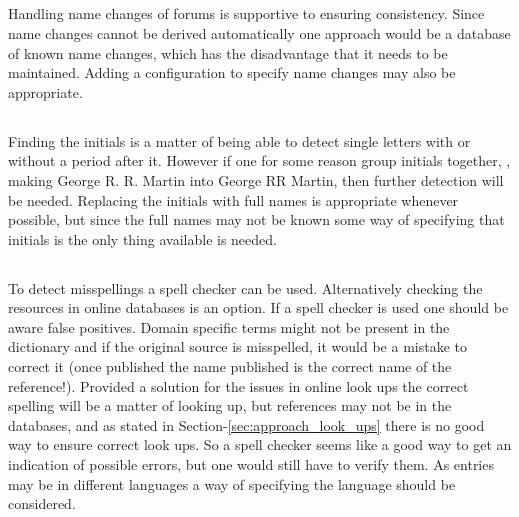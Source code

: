 \subsection{}

Handling name changes of forums is supportive to ensuring consistency.
Since name changes cannot be derived automatically one approach would
be a database of known name changes, which has the disadvantage that
it needs to be maintained.  Adding a configuration to specify name
changes may also be appropriate.


\subsection{}

Finding the initials is a matter of being able to detect single
letters with or without a period after it.  However if one for some
reason group initials together, \eg, making George R. R. Martin into
George RR Martin, then further detection will be needed.  Replacing
the initials with full names is appropriate whenever possible, but
since the full names may not be known some way of specifying that
initials is the only thing available is needed.


\subsection{}

To detect misspellings a spell checker can be used.  Alternatively
checking the resources in online databases is an option.  If a spell
checker is used one should be aware false positives.  Domain specific
terms might not be present in the dictionary and if the original
source is misspelled, it would be a mistake to correct it (once
published the name published is the correct name of the reference!).
Provided a solution for the issues in online look ups the correct
spelling will be a matter of looking up, but references may not be in
the databases, and as stated in Section-\ref{sec:approach_look_ups}
there is no good way to ensure correct look ups.  So a spell checker
seems like a good way to get an indication of possible errors, but one
would still have to verify them.  As entries may be in different
languages a way of specifying the language should be considered.


\subsection{}

